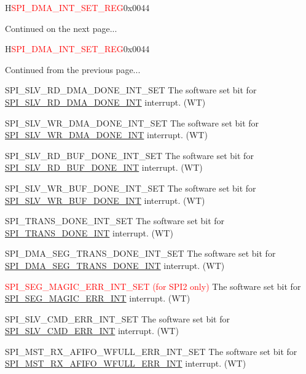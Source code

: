 \begin{register}{H}{\textcolor{red}{SPI\_DMA\_INT\_SET\_REG}}{0x{}0044}
\begin{regdesc}
\begin{reglist}
\item [Continued on the next page...]
\end{reglist}\end{regdesc}
\end{register}

\addtocounter{Regfloat}{-1}
\begin{register}{H}{\textcolor{red}{SPI\_DMA\_INT\_SET\_REG}}{0x{}0044}
\begin{regdesc}\begin{reglist}
\item [Continued from the previous page...]
\label{fielddesc:SPISLVRDDMADONEINTSET}\item [SPI\_SLV\_RD\_DMA\_DONE\_INT\_SET] The software set bit for \hyperref[int:SPISLVRDDMADONEINT]{SPI\_SLV\_RD\_DMA\_DONE\_INT} interrupt. (WT)
\label{fielddesc:SPISLVWRDMADONEINTSET}\item [SPI\_SLV\_WR\_DMA\_DONE\_INT\_SET] The software set bit for \hyperref[int:SPISLVWRDMADONEINT]{SPI\_SLV\_WR\_DMA\_DONE\_INT} interrupt. (WT)
\label{fielddesc:SPISLVRDBUFDONEINTSET}\item [SPI\_SLV\_RD\_BUF\_DONE\_INT\_SET] The software set bit for \hyperref[int:SPISLVRDBUFDONEINT]{SPI\_SLV\_RD\_BUF\_DONE\_INT} interrupt. (WT)
\label{fielddesc:SPISLVWRBUFDONEINTSET}\item [SPI\_SLV\_WR\_BUF\_DONE\_INT\_SET] The software set bit for \hyperref[int:SPISLVWRBUFDONEINT]{SPI\_SLV\_WR\_BUF\_DONE\_INT} interrupt. (WT)
\label{fielddesc:SPITRANSDONEINTSET}\item [SPI\_TRANS\_DONE\_INT\_SET] The software set bit for \hyperref[int:SPITRANSDONEINT]{SPI\_TRANS\_DONE\_INT} interrupt. (WT)
\label{fielddesc:SPIDMASEGTRANSDONEINTSET}\item [SPI\_DMA\_SEG\_TRANS\_DONE\_INT\_SET] The software set bit for \hyperref[int:SPIDMASEGTRANSDONEINT]{SPI\_DMA\_SEG\_TRANS\_DONE\_INT} interrupt. (WT)
\label{fielddesc:SPISEGMAGICERRINTSET}\item [\textcolor{red}{SPI\_SEG\_MAGIC\_ERR\_INT\_SET (for SPI2 only)}] The software set bit for \hyperref[int:SPISEGMAGICERRINT]{SPI\_SEG\_MAGIC\_ERR\_INT} interrupt. (WT)
\label{fielddesc:SPISLVCMDERRINTSET}\item [SPI\_SLV\_CMD\_ERR\_INT\_SET] The software set bit for \hyperref[int:SPISLVCMDERRINT]{SPI\_SLV\_CMD\_ERR\_INT} interrupt. (WT)
\label{fielddesc:SPIMSTRXAFIFOWFULLERRINTSET}\item [SPI\_MST\_RX\_AFIFO\_WFULL\_ERR\_INT\_SET] The software set bit for \hyperref[int:SPIMSTRXAFIFOWFULLERRINT]{SPI\_MST\_RX\_AFIFO\_WFULL\_ERR\_INT} interrupt. (WT)

\end{reglist}
\end{regdesc}
\end{register}
